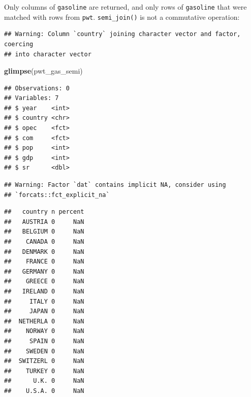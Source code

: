 \documentclass[]{gitbook}
\newenvironment{Shaded}{\begin{snugshade}}{\end{snugshade}}
\newcommand{\DataTypeTok}[1]{\textcolor[rgb]{0.13,0.29,0.53}{#1}}
\newcommand{\KeywordTok}[1]{\textcolor[rgb]{0.13,0.29,0.53}{\textbf{#1}}}
\newcommand{\NormalTok}[1]{#1}
\newcommand{\OperatorTok}[1]{\textcolor[rgb]{0.81,0.36,0.00}{\textbf{#1}}}
\newcommand{\StringTok}[1]{\textcolor[rgb]{0.31,0.60,0.02}{#1}}
\begin{document}
Only columns of \texttt{gasoline} are returned, and only rows of \texttt{gasoline} that were matched with rows
from \texttt{pwt}. \texttt{semi\_join()} is not a commutative operation:

\begin{Shaded}
\end{Shaded}

\begin{verbatim}
## Warning: Column `country` joining character vector and factor, coercing
## into character vector
\end{verbatim}

\begin{Shaded}
\begin{Highlighting}[]
\KeywordTok{glimpse}\NormalTok{(pwt_gas_semi)}
\end{Highlighting}
\end{Shaded}

\begin{verbatim}
## Observations: 0
## Variables: 7
## $ year    <int> 
## $ country <chr> 
## $ opec    <fct> 
## $ com     <fct> 
## $ pop     <int> 
## $ gdp     <int> 
## $ sr      <dbl>
\end{verbatim}

\begin{Shaded}
\end{Shaded}

\begin{verbatim}
## Warning: Factor `dat` contains implicit NA, consider using
## `forcats::fct_explicit_na`
\end{verbatim}

\begin{verbatim}
##   country n percent
##   AUSTRIA 0     NaN
##   BELGIUM 0     NaN
##    CANADA 0     NaN
##   DENMARK 0     NaN
##    FRANCE 0     NaN
##   GERMANY 0     NaN
##    GREECE 0     NaN
##   IRELAND 0     NaN
##     ITALY 0     NaN
##     JAPAN 0     NaN
##  NETHERLA 0     NaN
##    NORWAY 0     NaN
##     SPAIN 0     NaN
##    SWEDEN 0     NaN
##  SWITZERL 0     NaN
##    TURKEY 0     NaN
##      U.K. 0     NaN
##    U.S.A. 0     NaN
\end{verbatim}
\end{document}
